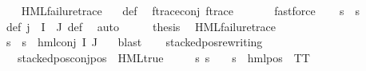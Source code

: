\begin{isabellebody}
\ \ \isamarkupfalse%
\ {\isachardoublequoteopen}HML{\isacharunderscore}{\kern0pt}failure{\isacharunderscore}{\kern0pt}trace\ {\isasympsi}{\isachardoublequoteclose}\ \isamarkupfalse%
\ {\isasympsi}{\isacharunderscore}{\kern0pt}def\ \isamarkupfalse%
\ f{\isacharunderscore}{\kern0pt}trace{\isacharunderscore}{\kern0pt}conj\ f{\isacharunderscore}{\kern0pt}trace\ \isanewline
\ \ \ \ \isamarkupfalse%
\ fastforce\isanewline
\ \ \isamarkupfalse%
\ {\isachardoublequoteopen}{\isasymforall}s{\isachardot}{\kern0pt}\ {\isasymnot}\ s\ {\isasymTurnstile}\ {\isasympsi}{\isachardoublequoteclose}\ \isanewline
\ \ \ \ \isamarkupfalse%
\ {\isasymPsi}{\isacharunderscore}{\kern0pt}def\ {\isacartoucheopen}j\ {\isasymin}\ I\ {\isasyminter}\ J{\isacartoucheclose}\ {\isasympsi}{\isacharunderscore}{\kern0pt}def\ \isamarkupfalse%
\ auto\isanewline
\ \ \isamarkupfalse%
\ \isamarkupfalse%
\ {\isacharquery}{\kern0pt}thesis\ \isamarkupfalse%
\ {\isacartoucheopen}HML{\isacharunderscore}{\kern0pt}failure{\isacharunderscore}{\kern0pt}trace\ {\isasympsi}{\isacartoucheclose}\ \isanewline
\ \ \ \ \isamarkupfalse%
\ {\isacartoucheopen}{\isasymforall}s{\isachardot}{\kern0pt}\ {\isasymnot}\ s\ {\isasymTurnstile}\ hml{\isacharunderscore}{\kern0pt}conj\ I\ J\ {\isasymPhi}{\isacartoucheclose}\ \isamarkupfalse%
\ blast\isanewline
\ \ \isamarkupfalse%
\isanewline
{}\isamarkupfalse%
\isanewline
\isanewline
{}\isamarkupfalse%
\ stacked{\isacharunderscore}{\kern0pt}pos{\isacharunderscore}{\kern0pt}rewriting{\isacharcolon}{\kern0pt}\isanewline
\ \ \ {\isachardoublequoteopen}stacked{\isacharunderscore}{\kern0pt}pos{\isacharunderscore}{\kern0pt}conj{\isacharunderscore}{\kern0pt}pos\ {\isasymphi}{\isachardoublequoteclose}\ {\isachardoublequoteopen}{\isasymnot}HML{\isacharunderscore}{\kern0pt}true\ {\isasymphi}{\isachardoublequoteclose}\isanewline
\ \ \ {\isachardoublequoteopen}{\isasymexists}{\isasymalpha}{\isachardot}{\kern0pt}\ {\isacharparenleft}{\kern0pt}{\isasymforall}s{\isachardot}{\kern0pt}\ {\isacharparenleft}{\kern0pt}s\ {\isasymTurnstile}\ {\isasymphi}{\isacharparenright}{\kern0pt}\ {\isasymlongleftrightarrow}\ {\isacharparenleft}{\kern0pt}s\ {\isasymTurnstile}\ {\isacharparenleft}{\kern0pt}hml{\isacharunderscore}{\kern0pt}pos\ {\isasymalpha}\ TT{\isacharparenright}{\kern0pt}{\isacharparenright}{\kern0pt}{\isacharparenright}{\kern0pt}{\isachardoublequoteclose}\isanewline

\end{isabellebody}
